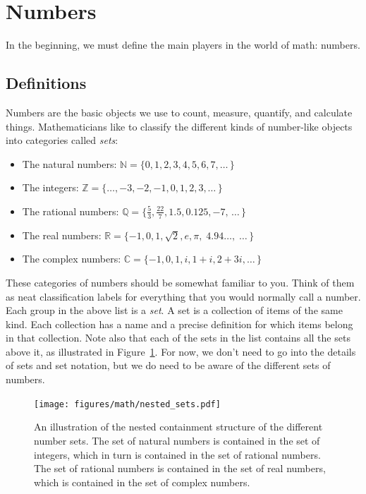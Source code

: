 
\section{Numbers}
\label{sec:numbers}

	In the beginning, we must define the main players in the world of math: numbers.

	\subsection{Definitions}
	\label{numbers:definitions}
		
		Numbers are the basic objects we use to count, measure, quantify, and calculate things.
		Mathematicians like to classify the different kinds of number-like objects into categories called \emph{sets}:					
		\begin{itemize}
			\item  The natural numbers: $\mathbb{N} = \{0,1,2,3,4,5,6,7, \ldots \, \}$
			\item  The integers: $\mathbb{Z} = \{\ldots, -3,-2,-1,0,1,2,3 , \ldots  \, \}$
			\item  The rational numbers: $\mathbb{Q} = \{\frac{5}{3}, \frac{22}{7}, 1.5, 0.125,  -7, \, \ldots \, \}$
			\item  The real numbers: $\mathbb{R} = \{-1,0,1, \sqrt{2}, e,\pi, \;  4.94\ldots, \; \ldots \, \}$
			\item  The complex numbers: $\mathbb{C} = \{ -1, 0, 1, i,  1+i, 2+3i,  \ldots \, \}$
		\end{itemize}
		These categories of numbers should be somewhat familiar to you.
		Think of them as neat classification labels for everything that you would normally call a number. 
	 	Each group in the above list is a \emph{set}.
		A set is a collection of items of the same kind. 
		Each collection has a name and a precise definition for which items belong in that collection.
		Note also that each of the sets in the list contains all the sets above it,												
		as illustrated in Figure~\ref{fig:nested_sets}.
		For now, we don't need to go into the details of sets and set notation,
		but we do need to be aware of the different sets of numbers.

		\begin{figure}[H]
			\centering
			\texttt{[image: figures/math/nested\_sets.pdf]}
			\caption{	An illustration of the nested containment structure of the different number sets.
					The set of natural numbers is contained in the set of integers,
					which in turn is contained in the set of rational numbers.
					The set of rational numbers is contained in the set of real numbers,
					which is contained in the set of complex numbers.}
			\label{fig:nested_sets}
		\end{figure}

